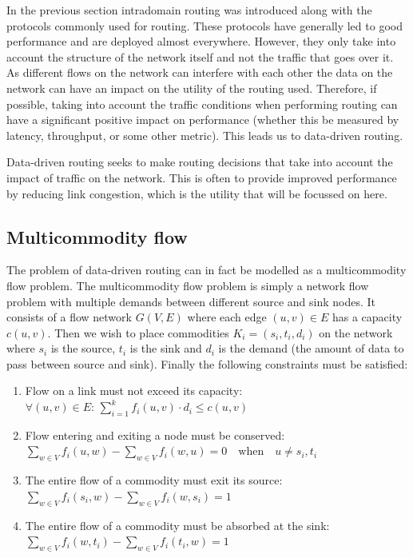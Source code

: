 In the previous section intradomain routing was introduced along with the protocols commonly used for routing. These protocols have generally led to good performance and are deployed almost everywhere. However, they only take into account the structure of the network itself and not the traffic that goes over it. As different flows on the network can interfere with each other the data on the network can have an impact on the utility of the routing used. Therefore, if possible, taking into account the traffic conditions when performing routing can have a significant positive impact on performance (whether this be measured by latency, throughput, or some other metric). This leads us to data-driven routing\cite{shi2013ddrp}.

Data-driven routing seeks to make routing decisions that take into account the impact of traffic on the network. This is often to provide improved performance by reducing link congestion, which is the utility that will be focussed on here.

\subsection{Multicommodity flow}
\label{section:multicommodity}

The problem of data-driven routing can in fact be modelled as a multicommodity flow problem\cite{Barnhart2001}. The multicommodity flow problem is simply a network flow problem with multiple demands between different source and sink nodes. It consists of a flow network $G(V,E)$ where each edge $(u,v) \in E$ has a capacity $c(u,v)$. Then we wish to place commodities $K_i = (s_i, t_i, d_i)$ on the network where $s_i$ is the source, $t_i$ is the sink and $d_i$ is the demand (the amount of data to pass between source and sink). Finally the following constraints must be satisfied:

\begin{enumerate}
    \item Flow on a link must not exceed its capacity:\\
    $\forall (u,v)\in E:\,\sum_{i=1}^{k} f_i(u,v)\cdot d_i \leq c(u,v)$
    \item Flow entering and exiting a node must be conserved:\\
    $\sum_{w \in V} f_i(u,w) - \sum_{w \in V} f_i(w,u) = 0 \quad \mathrm{when} \quad u \neq s_i, t_i$
    \item The entire flow of a commodity must exit its source:\\
    $\sum_{w \in V} f_i(s_i,w) - \sum_{w \in V} f_i(w,s_i) = 1$
    \item The entire flow of a commodity must be absorbed at the sink:\\
    $\sum_{w \in V} f_i(w,t_i) - \sum_{w \in V} f_i(t_i,w) = 1$
\end{enumerate}

